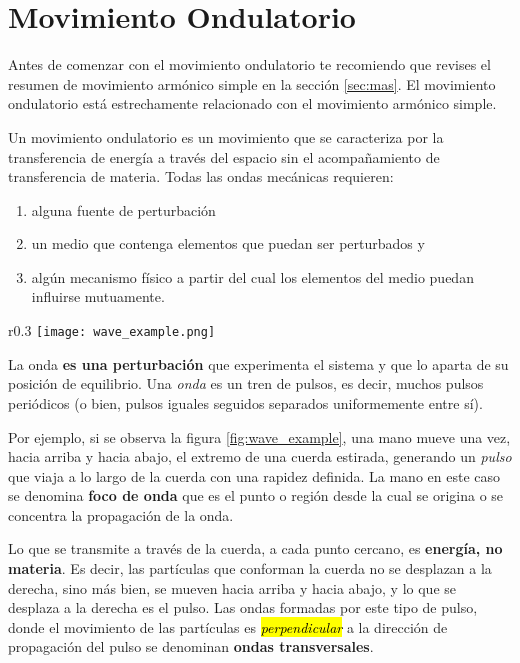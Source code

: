 \section{Movimiento Ondulatorio}

Antes de comenzar con el movimiento ondulatorio te recomiendo que revises el resumen de movimiento armónico simple en la sección \ref{sec:mas}. El movimiento ondulatorio está estrechamente relacionado con el movimiento armónico simple.

Un movimiento ondulatorio es un movimiento que se caracteriza por la transferencia de energía a través del espacio sin el acompañamiento de transferencia de materia. Todas las ondas mecánicas requieren:
\begin{enumerate}
  \item alguna fuente de perturbación
  \item un medio que contenga elementos que puedan ser perturbados y
  \item algún mecanismo físico a partir del cual los elementos del medio puedan influirse mutuamente.
\end{enumerate}

\begin{wrapfigure}{r}{0.3\textwidth}
  \centering
  \texttt{[image: wave\_example.png]}
  \caption{Un pulso que viaja a lo largo de la cuerda.}
  \label{fig:wave_example}
\end{wrapfigure}
La onda \textbf{es una perturbación} que experimenta el sistema y que lo aparta de su posición de equilibrio. Una \textit{onda} es un tren de pulsos, es decir, muchos pulsos periódicos (o bien, pulsos iguales seguidos separados uniformemente entre sí).

Por ejemplo, si se observa la figura \ref{fig:wave_example}, una mano mueve una vez, hacia arriba y hacia abajo, el extremo de una cuerda estirada, generando un \textit{pulso} que viaja a lo largo de la cuerda con una rapidez definida. La mano en este caso se denomina \textbf{foco de onda} que es el punto o región desde la cual se origina o se concentra la propagación de la onda.

Lo que se transmite a través de la cuerda, a cada punto cercano, es \textbf{energía, no materia}. Es decir, las partículas que conforman la cuerda no se desplazan a la derecha, sino más bien, se mueven hacia arriba y hacia abajo, y lo que se desplaza a la derecha es el pulso. Las ondas formadas por este tipo de pulso, donde el movimiento de las partículas es \hl{\textit{perpendicular}} a la dirección de propagación del pulso se denominan \textbf{ondas transversales}.

